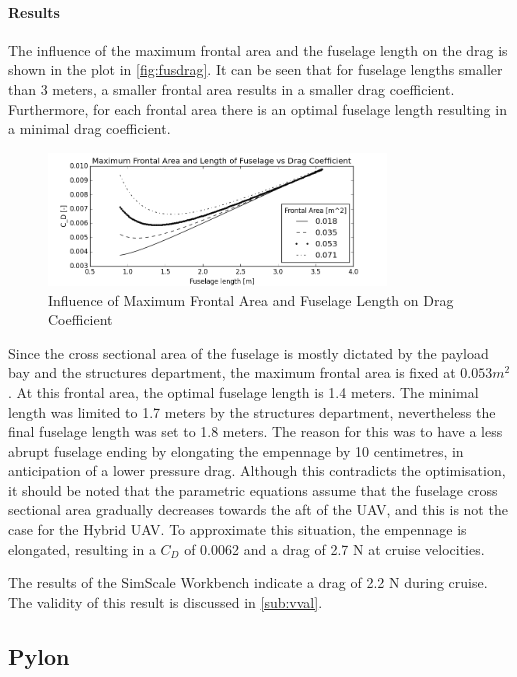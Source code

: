 \paragraph{Results} The influence of the maximum frontal area and the fuselage length on the drag is shown in the plot in \autoref{fig:fusdrag}. It can be seen that for fuselage lengths smaller than 3 meters, a smaller frontal area results in a smaller drag coefficient. Furthermore, for each frontal area there is an optimal fuselage length resulting in a minimal drag coefficient. 

\begin{figure}[H]
    \centering
    \includegraphics[width=0.8\textwidth]{Aerodynamics/Figures/fusdrag}
    \caption{Influence of Maximum Frontal Area and Fuselage Length on Drag Coefficient}
    \label{fig:fusdrag}
\end{figure}

Since the cross sectional area of the fuselage is mostly dictated by the payload bay and the structures department, the maximum frontal area is fixed at $0.053 m^{2}$. At this frontal area, the optimal fuselage length is 1.4 meters. The minimal length was limited to 1.7 meters by the structures department, nevertheless the final fuselage length was set to 1.8 meters. The reason for this was to have a less abrupt fuselage ending by elongating the empennage by 10 centimetres, in anticipation of a lower pressure drag. Although this contradicts the optimisation, it should be noted that the parametric equations assume that the fuselage cross sectional area gradually decreases towards the aft of the UAV, and this is not the case for the Hybrid UAV. To approximate this situation, the empennage is elongated, resulting in a $C_{D}$ of 0.0062 and a drag of 2.7 N at cruise velocities.


The results of the SimScale Workbench indicate a drag of 2.2 N during cruise. The validity of this result is discussed in \autoref{sub:vval}.

\subsection{Pylon}
\label{sec:aero_pylo}


